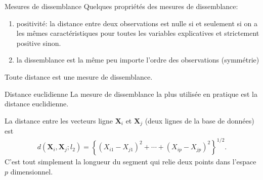 \documentclass[
  ignorenonframetext,
]{beamer}
\providecommand{\tightlist}{%
  \setlength{\itemsep}{0pt}\setlength{\parskip}{0pt}}\usepackage{longtable,booktabs,array}
\begin{document}
\begin{frame}{Mesures de dissemblance}
\protect\hypertarget{mesures-de-dissemblance}{}
Quelques propriétés des mesures de dissemblance:

\begin{enumerate}
\tightlist
\item
  positivité: la distance entre deux observations est nulle si et
  seulement si on a les mêmes caractéristiques pour toutes les variables
  explicatives et strictement positive sinon.
\item
  la dissemblance est la même peu importe l'ordre des observations
  (symmétrie)
\end{enumerate}

Toute distance est une mesure de dissemblance.
\end{frame}

\begin{frame}{Distance euclidienne}
\protect\hypertarget{distance-euclidienne}{}
La mesure de dissemblance la plus utilisée en pratique est la distance
euclidienne.

La distance entre les vecteurs ligne \(\mathbf{X}_i\) et
\(\mathbf{X}_j\) (deux lignes de la base de données) est \begin{align*}
d(\mathbf{X}_i, \mathbf{X}_j; l_2) = \left\{(X_{i1}-X_{j1})^2 + \cdots + (X_{ip}-X_{jp})^2\right\}^{1/2}.
\end{align*} C'est tout simplement la longueur du segment qui relie deux
points dans l'espace \(p\) dimensionnel.
\end{frame}
\end{document}
